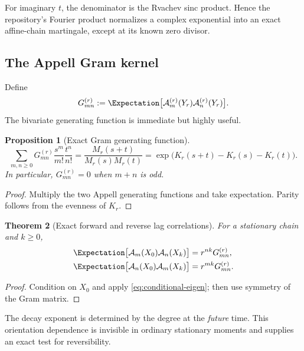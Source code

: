 \documentclass[11pt,a4paper]{article}
\newtheorem{theorem}{Theorem}[section]
\newtheorem{proposition}[theorem]{Proposition}
\theoremstyle{definition}
\theoremstyle{remark}
\newcommand{\Acal}{\mathcal A}
\begin{document}
For imaginary $t$, the denominator is the Rvachev sinc product. Hence the repository's Fourier product normalizes a complex exponential into an exact affine-chain martingale, except at its known zero divisor.

\subsection{The Appell Gram kernel}

Define
\begin{equation}
 G_{mn}^{(r)}:=\Expectation\bigl[\Acal_m^{(r)}(Y_r)\Acal_n^{(r)}(Y_r)\bigr].
 \label{eq:Gram}
\end{equation}
The bivariate generating function is immediate but highly useful.

\begin{proposition}[Exact Gram generating function]
\label{prop:Gram-EGF}
\begin{equation}
 \boxed{\displaystyle
 \sum_{m,n\ge0}G_{mn}^{(r)}\frac{s^m}{m!}\frac{t^n}{n!}
 =\frac{M_r(s+t)}{M_r(s)M_r(t)}
 =\exp\bigl(K_r(s+t)-K_r(s)-K_r(t)\bigr).}
 \label{eq:Gram-EGF}
\end{equation}
In particular, $G_{mn}^{(r)}=0$ when $m+n$ is odd.
\end{proposition}

\begin{proof}
Multiply the two Appell generating functions and take expectation. Parity follows from the evenness of $K_r$.
\end{proof}

\begin{theorem}[Exact forward and reverse lag correlations]
\label{thm:lag-correlations}
For a stationary chain and $k\ge0$,
\begin{align}
 \Expectation\bigl[\Acal_m(X_0)\Acal_n(X_k)\bigr]
 &=r^{nk}G_{mn}^{(r)},
 \label{eq:forward-lag}\\
 \Expectation\bigl[\Acal_n(X_0)\Acal_m(X_k)\bigr]
 &=r^{mk}G_{mn}^{(r)}.
 \label{eq:reverse-lag}
\end{align}
\end{theorem}

\begin{proof}
Condition on $X_0$ and apply \eqref{eq:conditional-eigen}; then use symmetry of the Gram matrix.
\end{proof}

The decay exponent is determined by the degree at the \emph{future} time. This orientation dependence is invisible in ordinary stationary moments and supplies an exact test for reversibility.
\end{document}
